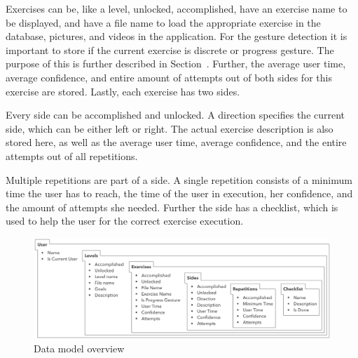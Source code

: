Exercises can be, like a level, unlocked, accomplished, have an exercise name to be displayed, and have a file name to load the appropriate exercise in the database, pictures, and videos in the application. For the gesture detection it is important to store if the current exercise is discrete or progress gesture. The purpose of this is further described in Section~\textit{}. Further, the average user time, average confidence, and entire amount of attempts out of both sides for this exercise are stored. Lastly, each exercise has two sides.

Every side can be accomplished and unlocked. A direction specifies the current side, which can be either left or right. The actual exercise description is also stored here, as well as the average user time, average confidence, and the entire attempts out of all repetitions.

Multiple repetitions are part of a side. A single repetition consists of a minimum time the user has to reach, the time of the user in execution, her confidence, and the amount of attempts she needed. 
Further the side has a checklist, which is used to help the user for the correct exercise execution.

\begin{figure}[htb]
	\centering
	\begin{minipage}[t]{1\linewidth}
		\centering
		\includegraphics[width=1\linewidth]{Pictures/5_2_dataModel}
		\caption{Data model overview}
		\label{fig:5_2_dataModel}
	\end{minipage}
\end{figure}

